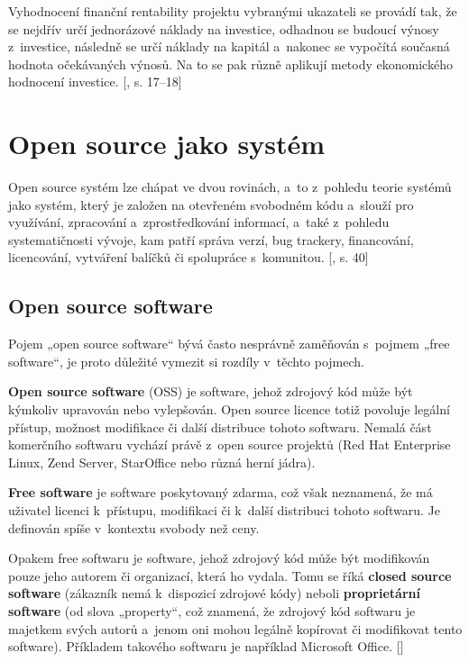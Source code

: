 \documentclass[
	11pt, oneside, printed, final, palatino
	microtype,
	table,   %
	lof,     %
	lot     %
]{fithesis3}
\newcommand{\citepages}[2]{[\cite{#2}, s. #1]}
\newcommand{\citesource}[1]{[\cite{#1}]}
\newcommand{\bold}[1]{\textbf{#1}}
\begin{document}
{Vyhodnocení finanční rentability projektu vybranými ukazateli se provádí tak, že se nejdřív určí jednorázové náklady na investice, odhadnou se budoucí výnosy z~investice, následně se určí náklady na kapitál a~nakonec se vypočítá současná hodnota očekávaných výnosů. Na to se pak různě aplikují metody ekonomického hodnocení investice. \citepages{17–18}{Podesvova2010thesis}

\section{Open source jako systém}
\indent Open source systém lze chápat ve dvou rovinách, a~to z~pohledu teorie systémů jako systém, který je založen na otevřeném svobodném kódu a~slouží pro využívání, zpracování a~zprostředkování informací, a~také z~pohledu systematičnosti vývoje, kam patří správa verzí, bug trackery, financování, licencování, vytváření balíčků či spolupráce s~komunitou. \citepages{40}{cejpek_2005}

\subsection{Open source software}
Pojem „open source software“ bývá často nesprávně zaměňován s~pojmem „free software“, je proto důležité vymezit si rozdíly v~těchto pojmech. 

\bold{Open source software} (OSS) je software, jehož zdrojový kód může být kýmkoliv upravován nebo vylepšován. Open source licence totiž povoluje legální přístup, možnost modifikace či další distribuce tohoto softwaru. Nemalá část komerčního softwaru vychází právě z~open source projektů (Red Hat Enterprise Linux, Zend Server, StarOffice nebo různá herní jádra).

\bold{Free software} je software poskytovaný zdarma, což však neznamená, že má uživatel licenci k~přístupu, modifikaci či k~další distribuci tohoto softwaru. Je definován spíše v~kontextu svobody než ceny. 

Opakem free softwaru je software, jehož zdrojový kód může být modifikován pouze jeho autorem či organizací, která ho vydala. Tomu se říká \bold{closed source software} (zákazník nemá k~dispozicí zdrojové kódy) neboli \bold{proprietární software} (od slova „property“, což znamená, že zdrojový kód softwaru je majetkem svých autorů a~jenom oni mohou legálně kopírovat či modifikovat tento software). Příkladem takového softwaru je například Microsoft Office. \citesource{mclean}

}
\end{document}
